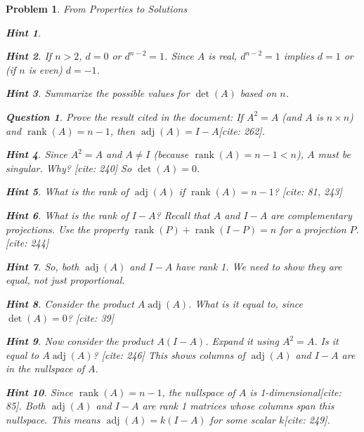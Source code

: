 \documentclass[12pt]{article}
\newtheorem{problem}{Problem}[section]
\newtheorem{question}{Question}[problem]
\theoremstyle{definition}
\newtheorem{hint}{Hint}[question]
\newcommand{\adj}{\operatorname{adj}}
\newcommand{\detm}{\operatorname{det}}
\newcommand{\rank}{\operatorname{rank}}
\begin{document}
\begin{problem}{From Properties to Solutions}
\begin{hint}
         \end{hint}
         \begin{hint}
             If $n>2$, $d=0$ or $d^{n-2}=1$. Since $A$ is real, $d^{n-2}=1$ implies $d=1$ or (if $n$ is even) $d=-1$.
         \end{hint}
         \begin{hint}
              Summarize the possible values for $\detm(A)$ based on $n$.
         \end{hint}
    

    \begin{question}
        Prove the result cited in the document: If $A^2=A$ (and $A$ is $n \times n$) and $\rank(A)=n-1$, then $\adj(A) = I-A$[cite: 262].
    \end{question}
    
        \begin{hint}
            Since $A^2=A$ and $A \neq I$ (because $\rank(A)=n-1 < n$), $A$ must be singular. Why? [cite: 240] So $\detm(A)=0$.
        \end{hint}
        \begin{hint}
            What is the rank of $\adj(A)$ if $\rank(A)=n-1$? [cite: 81, 243]
        \end{hint}
        \begin{hint}
            What is the rank of $I-A$? Recall that $A$ and $I-A$ are complementary projections. Use the property $\rank(P) + \rank(I-P) = n$ for a projection $P$. [cite: 244]
        \end{hint}
        \begin{hint}
            So, both $\adj(A)$ and $I-A$ have rank 1. We need to show they are equal, not just proportional.
        \end{hint}
        \begin{hint}
            Consider the product $A \adj(A)$. What is it equal to, since $\detm(A)=0$? [cite: 39]
        \end{hint}
        \begin{hint}
            Now consider the product $A(I-A)$. Expand it using $A^2=A$. Is it equal to $A \adj(A)$? [cite: 246] This shows columns of $\adj(A)$ and $I-A$ are in the nullspace of $A$.
        \end{hint}
        \begin{hint}
            Since $\rank(A)=n-1$, the nullspace of $A$ is 1-dimensional[cite: 85]. Both $\adj(A)$ and $I-A$ are rank 1 matrices whose columns span this nullspace. This means $\adj(A) = k(I-A)$ for some scalar $k$[cite: 249].

\end{hint}
\end{problem}
\end{document}
